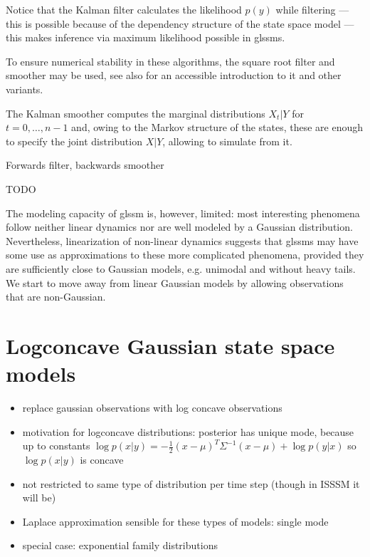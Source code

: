Notice that the Kalman filter calculates the likelihood $p(y)$ while filtering --- this is possible because of the dependency structure of the state space model --- this makes inference via maximum likelihood possible in \gls{glssm}s.

To ensure numerical stability in these algorithms, the square root filter and smoother \cite{Morf1975Squareroot} may be used, see also \cite{Schneider1986Kalmanfilter} for an accessible introduction to it and other variants.

The Kalman smoother computes the marginal distributions $X_{t} | Y$ for $t = 0, \dots, n-1$ and, owing to the Markov structure of the states, these are enough to specify the joint distribution $X|Y$, allowing to simulate from it.

\begin{algorithm}
    \caption{Forwards filter, backwards smoother \cite[Proposition 1]{Fruhwirth-Schnatter1994Data}}
    \begin{algorithmic}
        \Require TODO
    \end{algorithmic}
\end{algorithm}

The modeling capacity of \gls{glssm} is, however, limited: most interesting phenomena follow neither linear dynamics nor are well modeled by a Gaussian distribution.
Nevertheless, linearization of non-linear dynamics suggests that  \gls{glssm}s may have some use as approximations to these more complicated phenomena, provided they are sufficiently close to Gaussian models, e.g. unimodal and without heavy tails.
We start to move away from linear Gaussian models by allowing observations that are non-Gaussian.

\section{Logconcave Gaussian state space models}
\label{sec:logconcave_gaussian_state_space_models}

\begin{itemize}
    \item replace gaussian observations with log concave observations
    \item motivation for logconcave distributions: posterior has unique mode, because up to constants $\log p(x | y) = - \frac{1}{2} (x - \mu)^T \Sigma^{-1} (x - \mu) + \log p(y | x) $ so $\log p(x|y)$ is concave
    \item not restricted to same type of distribution per time step (though in ISSSM it will be)
    \item Laplace approximation sensible for these types of models: single mode
    \item special case: exponential family distributions
\end{itemize}

